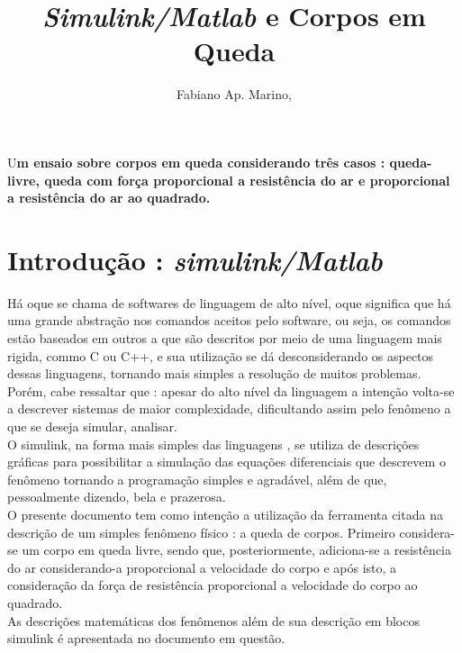 \documentclass[DIV=calc, paper=a4, fontsize=11pt, twocolumn]{scrartcl}	 %
\title{\textit{Simulink/Matlab} e Corpos em Queda} %
\author{Fabiano Ap. Marino, } %
\date{} %
\newcommand{\initial}[1]{ %
\lettrine[lines=3,lhang=0.3,nindent=0em]{
\color{DarkGoldenrod}
{\textsf{#1}}}{}}
\begin{document}
\maketitle %

\thispagestyle{fancy} %


\initial{U}\textbf{m ensaio sobre corpos em queda considerando três casos : queda-livre, queda com força proporcional a resistência do ar e proporcional a 
resistência do ar ao quadrado.}


\section*{Introdução : \textit{simulink/Matlab}}
Há oque se chama de softwares de linguagem de alto nível, oque significa que há uma grande abstração nos comandos aceitos pelo software, ou seja, os comandos
estão baseados em outros a que são descritos por meio de uma linguagem mais rigida, commo C ou C++, e sua utilização se dá desconsiderando os aspectos dessas
linguagens, tornando mais simples a resolução de muitos problemas. Porém, cabe ressaltar que : apesar do alto nível da linguagem a intenção volta-se a descrever
sistemas de maior complexidade, dificultando assim pelo fenômeno a que se deseja simular, analisar.\\
O simulink, na forma mais simples das linguagens , se utiliza de descrições gráficas para possibilitar a simulação das equações diferenciais que descrevem o fenômeno
tornando a programação simples e agradável, além de que, pessoalmente dizendo, bela e prazerosa.\\
O presente documento tem como intenção a utilização da ferramenta citada na descrição de um simples fenômeno físico : a queda de corpos. Primeiro considera-se 
um corpo em queda livre, sendo que, posteriormente, adiciona-se a resistência do ar considerando-a proporcional a velocidade do corpo e após isto, a consideração
da força de resistência proporcional a velocidade do corpo ao quadrado.\\
As descrições matemáticas dos fenômenos além de sua descrição em blocos simulink é apresentada no documento em questão.
\end{document}
